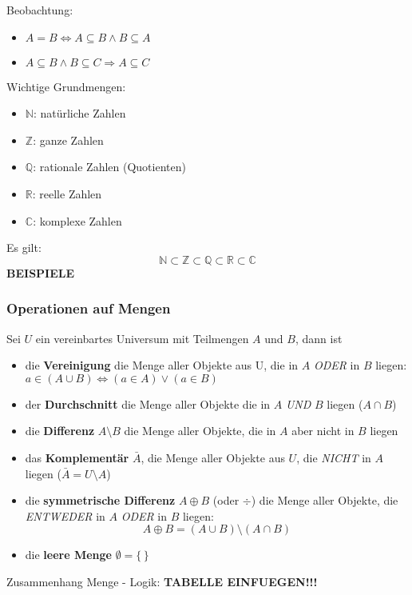 Beobachtung:
\begin{itemize}
\item $A=B \Leftrightarrow A\subseteq B \land B\subseteq A$
\item $A\subseteq B \land B\subseteq C \Rightarrow A\subseteq C$
\end{itemize}

Wichtige Grundmengen:
\begin{itemize}
\item $\mathbb{N}$: natürliche Zahlen
\item $\mathbb{Z}$: ganze Zahlen
\item $\mathbb{Q}$: rationale Zahlen (Quotienten)
\item $\mathbb{R}$: reelle Zahlen
\item $\mathbb{C}$: komplexe Zahlen
\end{itemize}
Es gilt:
\[
\mathbb{N}\subset\mathbb{Z}\subset\mathbb{Q}\subset\mathbb{R}\subset\mathbb{C}
\]
\textbf{BEISPIELE}

\subsubsection{Operationen auf Mengen}
Sei $U$ ein vereinbartes Universum mit Teilmengen $A$ und $B$, dann ist
\begin{itemize}
\item die \textbf{Vereinigung} die Menge aller Objekte aus U, die in $A$ \emph{ODER} in $B$ liegen:\\
$a\in (A\cup B) \Leftrightarrow (a\in A) \lor (a\in B)$
\item der \textbf{Durchschnitt} die Menge aller Objekte die in $A$ \emph{UND} $B$ liegen ($A\cap B$)
\item die \textbf{Differenz} $A\setminus B$ die Menge aller Objekte, die in $A$ aber nicht in $B$ liegen
\item das \textbf{Komplementär} $\bar{A}$, die Menge aller Objekte aus $U$, die \emph{NICHT} in $A$ liegen ($\bar{A} = U\setminus A$)
\item die \textbf{symmetrische Differenz} $A\oplus B$ (oder $\div$) die Menge aller Objekte, die \emph{ENTWEDER} in $A$ \emph{ODER} in $B$ liegen:
\[
A\oplus B = (A\cup B)\setminus (A\cap B)
\]
\item die \textbf{leere Menge} $\emptyset = \{\,\}$
\end{itemize}

Zusammenhang Menge - Logik:
\textbf{TABELLE EINFUEGEN!!!}

